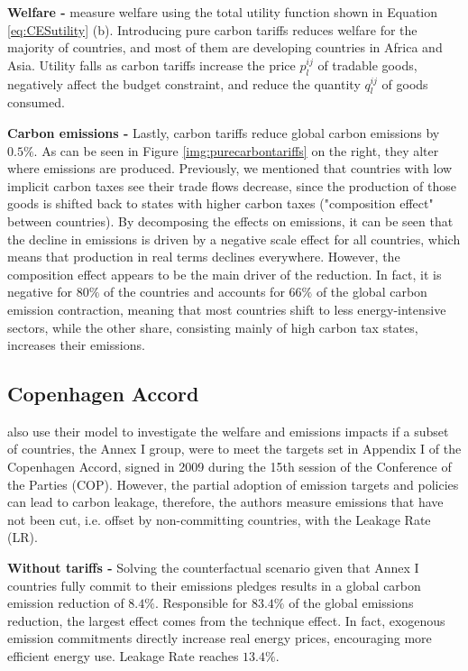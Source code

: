 \textbf{Welfare -} \textcite{Larch2017} measure welfare using the total utility function shown in Equation \ref{eq:CESutility} (b). Introducing pure carbon tariffs reduces welfare for the majority of countries, and most of them are developing countries in Africa and Asia. Utility falls as carbon tariffs increase the price $p_l^{ij}$ of tradable goods, negatively affect the budget constraint, and reduce the quantity $q_l^{ij}$ of goods consumed.

\textbf{Carbon emissions -} Lastly, carbon tariffs reduce global carbon emissions by $0.5\%$. As can be seen in Figure \ref{img:purecarbontariffs} on the right, they alter where emissions are produced. Previously, we mentioned that countries with low implicit carbon taxes see their trade flows decrease, since the production of those goods is shifted back to states with higher carbon taxes ("composition effect" between countries). By decomposing the effects on emissions, it can be seen that the decline in emissions is driven by a negative scale effect for all countries, which means that production in real terms declines everywhere. However, the composition effect appears to be the main driver of the reduction. In fact, it is negative for $80\%$ of the countries and accounts for $66\%$ of the global carbon emission contraction, meaning that most countries shift to less energy-intensive sectors, while the other share, consisting mainly of high carbon tax states, increases their emissions.

\subsection{Copenhagen Accord}

\textcite{Larch2017} also use their model to investigate the welfare and emissions impacts if a subset of countries, the Annex I group, were to meet the targets set in Appendix I of the Copenhagen Accord, signed in 2009 during the 15th session of the Conference of the Parties (COP). However, the partial adoption of emission targets and policies can lead to carbon leakage, therefore, the authors measure emissions that have not been cut, i.e. offset by non-committing countries, with the Leakage Rate (LR).

\textbf{Without tariffs -} Solving the counterfactual scenario given that Annex I countries fully commit to their emissions pledges results in a global carbon emission reduction of $8.4\%$. Responsible for $83.4\%$ of the global emissions reduction, the largest effect comes from the technique effect. In fact, exogenous emission commitments directly increase real energy prices, encouraging more efficient energy use. Leakage Rate reaches $13.4\%$.

